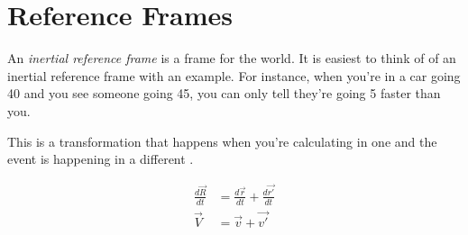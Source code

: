 \section{Reference Frames}\label{sec:Reference Frames}
\begin{definition}\label{def:Reference Frames}
  An \emph{inertial reference frame} is a frame for the world.
  It is easiest to think of of an inertial reference frame with an example.
  For instance, when you're in a car going 40 \si{\mph} and you see someone going 45, you can only tell they're going 5 \si{\mph} faster than you.
\end{definition}

\begin{definition}\label{def:Galileo Transformation}
  This is a transformation that happens when you're calculating in one  and the event is happening in a different .

  \begin{equation}\label{eq:Galileo Transformation}
    \begin{aligned}
      \frac{d \vec{R}}{dt} &= \frac{d \vec{r}}{dt} + \frac{d \vec{r'}}{dt} \\
      \vec{V} &= \vec{v} + \vec{v'}
    \end{aligned}
  \end{equation}
\end{definition}

